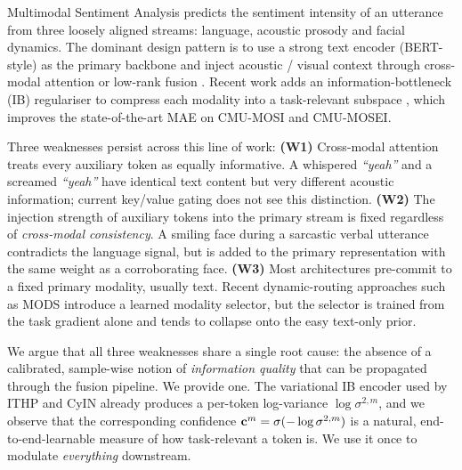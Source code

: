 Multimodal Sentiment Analysis
\citep{zadeh2016mosi,zadeh2018mosei,liu2022simsv2}
predicts the sentiment intensity of an utterance from three loosely
aligned streams: language, acoustic prosody and facial dynamics.
The dominant design pattern is to use a strong text encoder
(BERT-style) as the primary backbone and inject acoustic / visual
context through cross-modal attention or low-rank fusion
\citep{rahman2020magbert,tsai2019mult,yu2021selfmm,han2021mmim}.
Recent work adds an information-bottleneck (IB) regulariser to compress
each modality into a task-relevant subspace
\citep{ithp2024,wu2023dbf,cmib2023,camib2026}, which improves the
state-of-the-art MAE on \textsc{CMU-MOSI} and \textsc{CMU-MOSEI}.

Three weaknesses persist across this line of work:
\textbf{(W1)} Cross-modal attention treats every auxiliary token as
equally informative.
A whispered \textit{``yeah''} and a screamed \textit{``yeah''} have
identical text content but very different acoustic information; current
key/value gating does not see this distinction.
\textbf{(W2)} The injection strength of auxiliary tokens into the
primary stream is fixed regardless of \emph{cross-modal consistency}.
A smiling face during a sarcastic verbal utterance contradicts the
language signal, but is added to the primary representation with the
same weight as a corroborating face.
\textbf{(W3)} Most architectures pre-commit to a fixed primary
modality, usually text.
Recent dynamic-routing approaches such as MODS \citep{wang2023cross}
introduce a learned modality selector, but the selector is trained from
the task gradient alone and tends to collapse onto the easy text-only
prior.

We argue that all three weaknesses share a single root cause: the
absence of a calibrated, sample-wise notion of \emph{information
quality} that can be propagated through the fusion pipeline.
We provide one.
The variational IB encoder used by ITHP and CyIN already produces a
per-token log-variance $\log\sigma^{2,m}$, and we observe that the
corresponding confidence
$\mathbf{c}^{m}=\sigma(-\log\sigma^{2,m})$
is a natural, end-to-end-learnable measure of how task-relevant a token
is.
We use it once to modulate \emph{everything} downstream.

